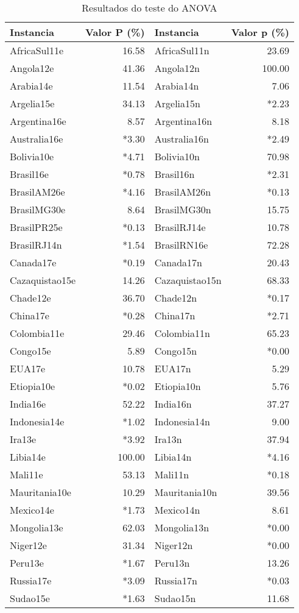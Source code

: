 \begin{table}[htb]

\caption{Resultados do teste do ANOVA}
\label{tab:resultados_anova}
\begin{tabular}{@{}lr|lr@{}}
\toprule
Instancia&Valor P (\%)&Instancia&Valor p (\%)\\\midrule
AfricaSul11e&16.58&AfricaSul11n&23.69\\
Angola12e&41.36&Angola12n&100.00\\
Arabia14e&11.54&Arabia14n&7.06\\
Argelia15e&34.13&Argelia15n&*2.23\\
Argentina16e&8.57&Argentina16n&8.18\\
Australia16e&*3.30&Australia16n&*2.49\\
Bolivia10e&*4.71&Bolivia10n&70.98\\
Brasil16e&*0.78&Brasil16n&*2.31\\
BrasilAM26e&*4.16&BrasilAM26n&*0.13\\
BrasilMG30e&8.64&BrasilMG30n&15.75\\
BrasilPR25e&*0.13&BrasilRJ14e&10.78\\
BrasilRJ14n&*1.54&BrasilRN16e&72.28\\
Canada17e&*0.19&Canada17n&20.43\\
Cazaquistao15e&14.26&Cazaquistao15n&68.33\\
Chade12e&36.70&Chade12n&*0.17\\
China17e&*0.28&China17n&*2.71\\
Colombia11e&29.46&Colombia11n&65.23\\
Congo15e&5.89&Congo15n&*0.00\\
EUA17e&10.78&EUA17n&5.29\\
Etiopia10e&*0.02&Etiopia10n&5.76\\
India16e&52.22&India16n&37.27\\
Indonesia14e&*1.02&Indonesia14n&9.00\\
Ira13e&*3.92&Ira13n&37.94\\
Libia14e&100.00&Libia14n&*4.16\\
Mali11e&53.13&Mali11n&*0.18\\
Mauritania10e&10.29&Mauritania10n&39.56\\
Mexico14e&*1.73&Mexico14n&8.61\\
Mongolia13e&62.03&Mongolia13n&*0.00\\
Niger12e&31.34&Niger12n&*0.00\\
Peru13e&*1.67&Peru13n&13.26\\
Russia17e&*3.09&Russia17n&*0.03\\
Sudao15e&*1.63&Sudao15n&11.68\\
\bottomrule
\end{tabular}
\end{table}
